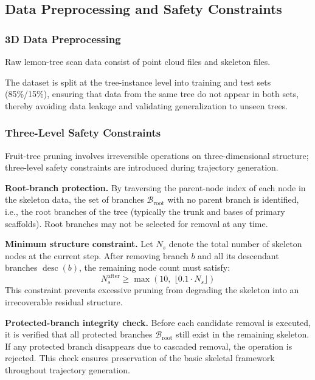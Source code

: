 \documentclass[12pt,a4paper,fontset=fandol]{ctexart}
\begin{document}
\subsection{Data Preprocessing and Safety Constraints}\label{sec:model:preprocess}

\subsubsection{3D Data Preprocessing}

Raw lemon-tree scan data consist of point cloud files and skeleton files.

The dataset is split at the tree-instance level into training and test sets (85\%/15\%),
ensuring that data from the same tree do not appear in both sets,
thereby avoiding data leakage and validating generalization to unseen trees.

\subsubsection{Three-Level Safety Constraints}

Fruit-tree pruning involves irreversible operations on three-dimensional structure;
three-level safety constraints are introduced during trajectory generation.

\textbf{Root-branch protection.}
By traversing the parent-node index of each node in the skeleton data,
the set of branches $\mathcal{B}_{\text{root}}$ with no parent branch is identified,
i.e., the root branches of the tree (typically the trunk and bases of primary scaffolds).
Root branches may not be selected for removal at any time.

\textbf{Minimum structure constraint.}
Let $N_s$ denote the total number of skeleton nodes at the current step.
After removing branch $b$ and all its descendant branches $\operatorname{desc}(b)$,
the remaining node count must satisfy:
\begin{equation}\label{eq:min_structure}
  N_s^{\text{after}} \geq \max\!\left(10,\; \lfloor 0.1 \cdot N_s \rfloor\right)
\end{equation}
This constraint prevents excessive pruning from degrading the skeleton into an irrecoverable residual structure.

\textbf{Protected-branch integrity check.}
Before each candidate removal is executed,
it is verified that all protected branches $\mathcal{B}_{\text{root}}$ still exist in the remaining skeleton.
If any protected branch disappears due to cascaded removal, the operation is rejected.
This check ensures preservation of the basic skeletal framework throughout trajectory generation.
\end{document}
